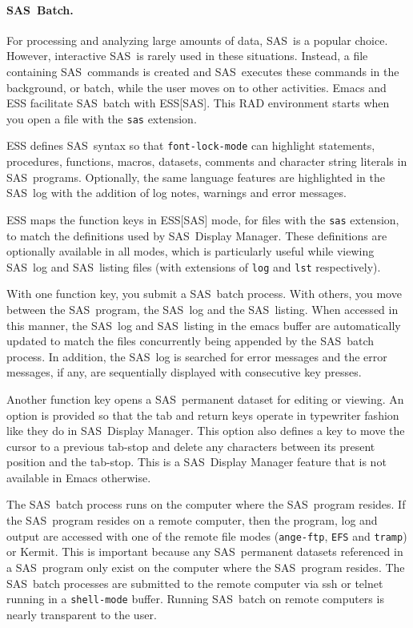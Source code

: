 \documentclass{article}
\newcommand*{\SAS}{\textsc{SAS}}
\newcommand{\stexttt}[1]{{\small\texttt{#1}}}
\begin{document}
\paragraph{\SAS\ Batch.}
\label{sec:sas-batch}

For processing and analyzing large amounts of data, \SAS\ is a popular
choice.  However, interactive \SAS\ is rarely used in these situations.
Instead, a file containing \SAS\ commands is created and \SAS\ executes
these commands in the background, or batch, while the user moves on to 
other activities.  Emacs and ESS facilitate \SAS\ batch with ESS[SAS].  
This RAD environment starts when you open a file with the \stexttt{sas}
extension.

ESS defines \SAS\ syntax so that \stexttt{font-lock-mode} can highlight
statements, procedures, functions, macros, datasets, comments and character 
string literals in \SAS\ programs.  Optionally, the same language features 
are highlighted in the \SAS\ log with the addition of log notes, warnings 
and error messages.

ESS maps the function keys in ESS[SAS] mode, for files with the
\stexttt{sas} extension, to match the definitions used by \SAS\
Display Manager.  These definitions are optionally
available in all modes, which is particularly useful
while viewing \SAS\ log and \SAS\ listing files (with extensions of
\stexttt{log} and \stexttt{lst} respectively).

With one function key, you submit a \SAS\ batch process.  With others,
you move between the \SAS\ program, the \SAS\ log and the \SAS\
listing.  When accessed in this manner, the \SAS\ log and \SAS\
listing in the emacs buffer are automatically updated to match the
files concurrently being appended by the \SAS\ batch process.  In
addition, the \SAS\ log is searched for error messages and the error
messages, if any, are sequentially displayed with consecutive key
presses.

Another function key opens a \SAS\ permanent dataset for editing or viewing.  
An option is provided so that the tab and return keys operate in typewriter 
fashion like they do in \SAS\ Display Manager.  This option also defines a 
key to move the cursor to a previous tab-stop and delete any 
characters between its present position and the tab-stop.  This is a \SAS\
Display Manager feature that is not available in Emacs otherwise. 

The \SAS\ batch process runs on the computer where the \SAS\ program
resides.  If the \SAS\ program resides on a remote computer, then the
program, log and output are accessed with one of the remote file modes
(\stexttt{ange-ftp}, \stexttt{EFS} and \stexttt{tramp}) or Kermit.
This is important because any \SAS\ permanent datasets referenced in a
\SAS\ program only exist on the computer where the \SAS\ program
resides.  The \SAS\ batch processes are submitted to the remote
computer via ssh or telnet running in a \stexttt{shell-mode} buffer.
Running \SAS\ batch on remote computers is nearly transparent to the user.
\end{document}
